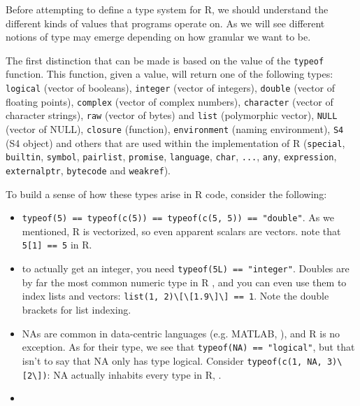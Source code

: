 \documentclass[acmsmall,10pt,review,anonymous]{acmart}\settopmatter{printfolios=true,printccs=false,printacmref=false}
\newcommand{\code}[1]{\lstinline|#1|\xspace}
\begin{document}
Before attempting to define a type system for R, we should understand the
different kinds of values that programs operate on.  As we will see
different notions of type may emerge depending on how granular we want to
be.

The first distinction that can be made is based on the value of the
\code{typeof} function.  This function, given a value, will return one of
the following types: \code{logical} (vector of booleans), \code{integer}
(vector of integers), \code{double} (vector of floating points),
\code{complex} (vector of complex numbers), \code{character} (vector of
character strings), \code{raw} (vector of bytes) and \code{list}
(polymorphic vector), \code{NULL} (vector of NULL),
\code{closure} (function), \code{environment} (naming environment),
\code{S4} (S4 object) and others that are used within the implementation of
R (\code{special}, \code{builtin}, \code{symbol}, \code{pairlist},
\code{promise}, \code{language}, \code{char}, \code{...}, \code{any},
\code{expression}, \code{externalptr}, \code{bytecode} and \code{weakref}).

\AT{Some examples of use of \code{typeof}:}
To build a sense of how these types arise in R code, consider the following:

\begin{itemize}

	\item \code{typeof(5) == typeof(c(5)) == typeof(c(5, 5)) == "double"}.
	As we mentioned, R is vectorized, so even apparent scalars are vectors.
	 note that \code{5[1] == 5} in R.
	
	\item to actually get an integer, you need \code{typeof(5L) == "integer"}.
	Doubles are by far the most common numeric type in R , and you can even use them to index lists and vectors: \code{list(1, 2)\[\[1.9\]\] == 1}.
	Note the double brackets for list indexing.
	
	\item NAs are common in data-centric languages (e.g. MATLAB, ), and R is no exception.
	As for their type, we see that \code{typeof(NA) == "logical"}, but that isn't to say that NA only has type logical.
	Consider \code{typeof(c(1, NA, 3)\[2\])}: NA actually inhabits every type in R, .

	\item {}

\end{itemize}
\end{document}
